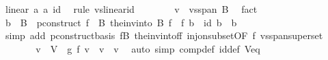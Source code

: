\begin{isabellebody}
\ {\isachardoublequoteopen}linear\ {\isacharparenleft}{\kern0pt}{\isacharasterisk}{\kern0pt}a{\isacharparenright}{\kern0pt}\ {\isacharparenleft}{\kern0pt}{\isacharasterisk}{\kern0pt}a{\isacharparenright}{\kern0pt}\ id{\isachardoublequoteclose}\ \isamarkupfalse%
\ {\isacharparenleft}{\kern0pt}rule\ vs{}{\isachardot}{\kern0pt}linear{\isacharunderscore}{\kern0pt}id{\isacharparenright}{\kern0pt}\isanewline
\ \ \ \ \ \ \isamarkupfalse%
\ {\isachardoublequoteopen}v\ {\isasymin}\ vs{}{\isachardot}{\kern0pt}span\ B{\isachardoublequoteclose}\ \isamarkupfalse%
\ fact\isanewline
\ \ \ \ \ \ \isamarkupfalse%
\ {\isachardoublequoteopen}b\ {\isasymin}\ B\ {\isasymLongrightarrow}\ {\isacharparenleft}{\kern0pt}p{\isachardot}{\kern0pt}construct\ {\isacharparenleft}{\kern0pt}f\ {\isacharbackquote}{\kern0pt}\ B{\isacharparenright}{\kern0pt}\ {\isacharparenleft}{\kern0pt}the{\isacharunderscore}{\kern0pt}inv{\isacharunderscore}{\kern0pt}into\ B\ f{\isacharparenright}{\kern0pt}\ {\isasymcirc}\ f{\isacharparenright}{\kern0pt}\ b\ {\isacharequal}{\kern0pt}\ id\ b{\isachardoublequoteclose}\ \ b\isanewline
\ \ \ \ \ \ \ \ \isamarkupfalse%
\ {\isacharparenleft}{\kern0pt}simp\ add{\isacharcolon}{\kern0pt}\ p{\isachardot}{\kern0pt}construct{\isacharunderscore}{\kern0pt}basis\ fB\ the{\isacharunderscore}{\kern0pt}inv{\isacharunderscore}{\kern0pt}into{\isacharunderscore}{\kern0pt}f{\isacharunderscore}{\kern0pt}f\ inj{\isacharunderscore}{\kern0pt}on{\isacharunderscore}{\kern0pt}subset{\isacharbrackleft}{\kern0pt}OF\ f\ vs{}{\isachardot}{\kern0pt}span{\isacharunderscore}{\kern0pt}superset{\isacharbrackright}{\kern0pt}{\isacharparenright}{\kern0pt}\isanewline
\ \ \ \ \isamarkupfalse%
\isanewline
\ \ \ \ \isamarkupfalse%
\ \isamarkupfalse%
\ {\isachardoublequoteopen}v\ {\isasymin}\ V\ {\isasymLongrightarrow}\ {\isacharquery}{\kern0pt}g\ {\isacharparenleft}{\kern0pt}f\ v{\isacharparenright}{\kern0pt}\ {\isacharequal}{\kern0pt}\ v{\isachardoublequoteclose}\ \ v\ \isamarkupfalse%
\ {\isacharparenleft}{\kern0pt}auto\ simp{\isacharcolon}{\kern0pt}\ comp{\isacharunderscore}{\kern0pt}def\ id{\isacharunderscore}{\kern0pt}def\ V{\isacharunderscore}{\kern0pt}eq{\isacharparenright}{\kern0pt}\isanewline
\ \ \isamarkupfalse%
\isanewline
{}\isamarkupfalse%
%
\endisatagproof
{\isafoldproof}%
%
\isadelimproof
\isanewline
%
\endisadelimproof
\isanewline
{}\isamarkupfalse%

\end{isabellebody}
